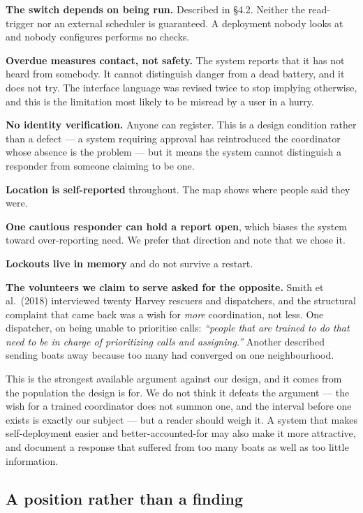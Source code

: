 \textbf{The switch depends on being run.} Described in §4.2. Neither the
read-trigger nor an external scheduler is guaranteed. A deployment
nobody looks at and nobody configures performs no checks.

\textbf{Overdue measures contact, not safety.} The system reports that
it has not heard from somebody. It cannot distinguish danger from a dead
battery, and it does not try. The interface language was revised twice
to stop implying otherwise, and this is the limitation most likely to be
misread by a user in a hurry.

\textbf{No identity verification.} Anyone can register. This is a design
condition rather than a defect --- a system requiring approval has
reintroduced the coordinator whose absence is the problem --- but it
means the system cannot distinguish a responder from someone claiming to
be one.

\textbf{Location is self-reported} throughout. The map shows where
people said they were.

\textbf{One cautious responder can hold a report open}, which biases the
system toward over-reporting need. We prefer that direction and note
that we chose it.

\textbf{Lockouts live in memory} and do not survive a restart.

\textbf{The volunteers we claim to serve asked for the opposite.} Smith
et al.~(2018) interviewed twenty Harvey rescuers and dispatchers, and
the structural complaint that came back was a wish for \emph{more}
coordination, not less. One dispatcher, on being unable to prioritise
calls: \emph{``people that are trained to do that need to be in charge
of prioritizing calls and assigning.''} Another described sending boats
away because too many had converged on one neighbourhood.

This is the strongest available argument against our design, and it
comes from the population the design is for. We do not think it defeats
the argument --- the wish for a trained coordinator does not summon one,
and the interval before one exists is exactly our subject --- but a
reader should weigh it. A system that makes self-deployment easier and
better-accounted-for may also make it more attractive, and \citeauthor{smith2018} document a response that suffered from too many boats as well as too
little information.

\subsection{A position rather than a finding}

